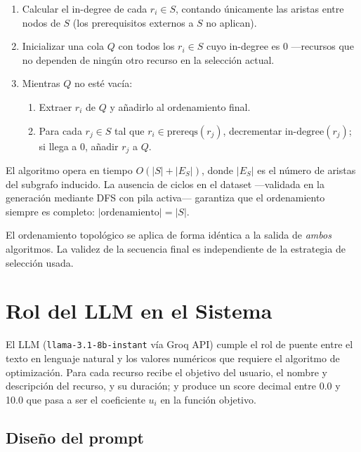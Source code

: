 \documentclass[11pt, a4paper]{article}
\begin{document}
\begin{enumerate}[leftmargin=2em]
  \item Calcular el in-degree de cada $r_i \in S$, contando únicamente las
        aristas entre nodos de $S$ (los prerequisitos externos a $S$ no
        aplican).
  \item Inicializar una cola $Q$ con todos los $r_i \in S$ cuyo in-degree
        es 0 —recursos que no dependen de ningún otro recurso en la
        selección actual.
  \item Mientras $Q$ no esté vacía:
        \begin{enumerate}[label=\alph*.]
          \item Extraer $r_i$ de $Q$ y añadirlo al ordenamiento final.
          \item Para cada $r_j \in S$ tal que $r_i \in \mathrm{prereqs}(r_j)$,
                decrementar $\mathrm{in\text{-}degree}(r_j)$; si llega a 0,
                añadir $r_j$ a $Q$.
        \end{enumerate}
\end{enumerate}

El algoritmo opera en tiempo $O(|S| + |E_S|)$, donde $|E_S|$ es el número de
aristas del subgrafo inducido. La ausencia de ciclos en el dataset —validada
en la generación mediante DFS con pila activa— garantiza que el ordenamiento
siempre es completo: $|\mathrm{ordenamiento}| = |S|$.

\begin{notebox}
El ordenamiento topológico se aplica de forma idéntica a la salida de
\emph{ambos} algoritmos. La validez de la secuencia final es independiente
de la estrategia de selección usada.
\end{notebox}

\section{Rol del LLM en el Sistema}

El LLM (\texttt{llama-3.1-8b-instant} vía Groq API) cumple el rol de puente entre el texto en lenguaje natural y los valores numéricos que requiere el algoritmo de optimización. Para cada recurso recibe el objetivo del usuario, el nombre y descripción del recurso, y su duración; y produce un score decimal entre 0.0 y 10.0 que pasa a ser el coeficiente $u_i$ en la función objetivo.

\subsection{Diseño del prompt}
\end{document}
